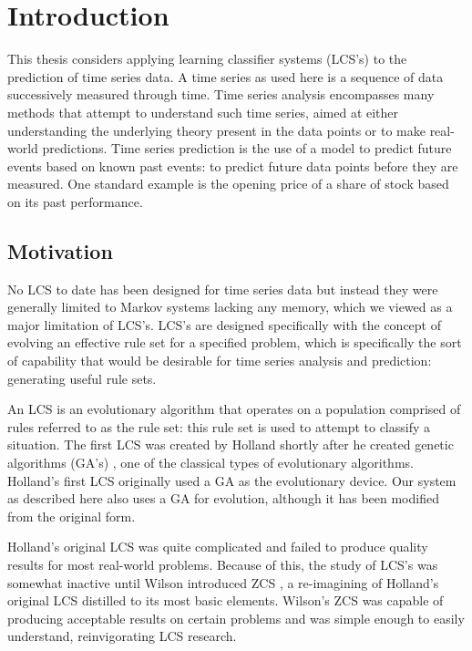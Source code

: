 \section{Introduction}

This thesis considers applying learning classifier systems (LCS's) to the prediction of time series data.
A time series as used here is a sequence of data successively measured through time.
Time series analysis encompasses many methods that attempt to understand such time series, aimed at either understanding the underlying theory present in the data points or to make real-world predictions.
Time series prediction is the use of a model to predict future events based on known past events: to predict future data points before they are measured.
One standard example is the opening price of a share of stock based on its past performance.

\subsection{Motivation}
No LCS to date has been designed for time series data but instead they were generally limited to Markov systems lacking any memory, which we viewed as a major limitation of LCS's.
LCS's are designed specifically with the concept of evolving an effective rule set for a specified problem, which is specifically the sort of capability that would be desirable for time series analysis and prediction: generating useful rule sets.

An LCS is an evolutionary algorithm that operates on a population comprised of rules referred to as the rule set: this rule set is used to attempt to classify a situation.
The first LCS was created by Holland \cite{HollandLCS} shortly after he created genetic algorithms (GA's) \cite{HollandGA}, one of the classical types of evolutionary algorithms.
Holland's first LCS originally used a GA as the evolutionary device.
Our system as described here also uses a GA for evolution, although it has been modified from the original form.

Holland's original LCS was quite complicated and failed to produce quality results for most real-world problems.
Because of this, the study of LCS's was somewhat inactive until Wilson introduced ZCS \cite{WilsonZCS}, a re-imagining of Holland's original LCS distilled to its most basic elements.
Wilson's ZCS was capable of producing acceptable results on certain problems and was simple enough to easily understand, reinvigorating LCS research.

